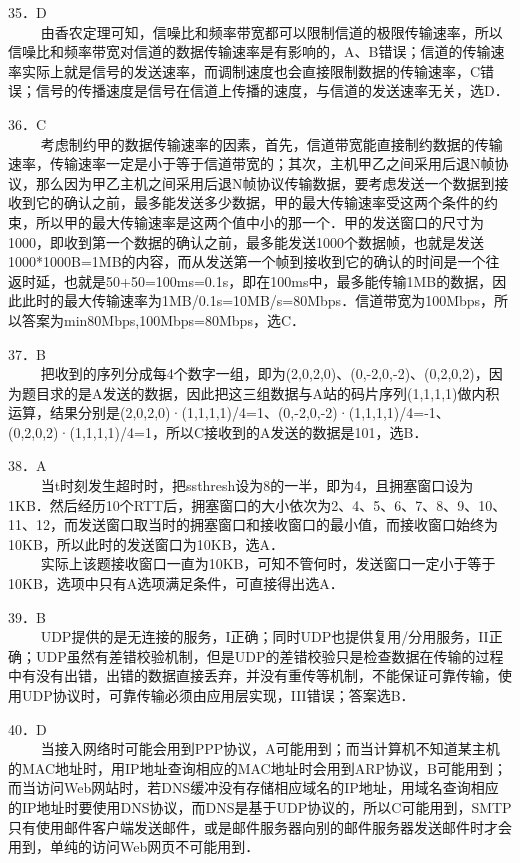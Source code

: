 35．D \\
$\qquad$ 由香农定理可知，信噪比和频率带宽都可以限制信道的极限传输速率，所以信噪比和频率带宽对信道的数据传输速率是有影响的，A、B错误；信道的传输速率实际上就是信号的发送速率，而调制速度也会直接限制数据的传输速率，C错误；信号的传播速度是信号在信道上传播的速度，与信道的发送速率无关，选D．

36．C \\
$\qquad$ 考虑制约甲的数据传输速率的因素，首先，信道带宽能直接制约数据的传输速率，传输速率一定是小于等于信道带宽的；其次，主机甲乙之间采用后退N帧协议，那么因为甲乙主机之间采用后退N帧协议传输数据，要考虑发送一个数据到接收到它的确认之前，最多能发送多少数据，甲的最大传输速率受这两个条件的约束，所以甲的最大传输速率是这两个值中小的那一个．甲的发送窗口的尺寸为1000，即收到第一个数据的确认之前，最多能发送1000个数据帧，也就是发送1000*1000B=1MB的内容，而从发送第一个帧到接收到它的确认的时间是一个往返时延，也就是50+50=100ms=0.1s，即在100ms中，最多能传输1MB的数据，因此此时的最大传输速率为1MB/0.1s=10MB/s=80Mbps．信道带宽为100Mbps，所以答案为min{80Mbps,100Mbps}=80Mbps，选C．

37．B \\
$\qquad$ 把收到的序列分成每4个数字一组，即为(2,0,2,0)、(0,-2,0,-2)、(0,2,0,2)，因为题目求的是A发送的数据，因此把这三组数据与A站的码片序列(1,1,1,1)做内积运算，结果分别是(2,0,2,0)·(1,1,1,1)/4=1、(0,-2,0,-2)·(1,1,1,1)/4=-1、(0,2,0,2)·(1,1,1,1)/4=1，所以C接收到的A发送的数据是101，选B．

38．A \\
$\qquad$ 当t时刻发生超时时，把ssthresh设为8的一半，即为4，且拥塞窗口设为1KB．然后经历10个RTT后，拥塞窗口的大小依次为2、4、5、6、7、8、9、10、11、12，而发送窗口取当时的拥塞窗口和接收窗口的最小值，而接收窗口始终为10KB，所以此时的发送窗口为10KB，选A． \\
$\qquad$ 实际上该题接收窗口一直为10KB，可知不管何时，发送窗口一定小于等于10KB，选项中只有A选项满足条件，可直接得出选A．


39．B \\
$\qquad$ UDP提供的是无连接的服务，I正确；同时UDP也提供复用/分用服务，II正确；UDP虽然有差错校验机制，但是UDP的差错校验只是检查数据在传输的过程中有没有出错，出错的数据直接丢弃，并没有重传等机制，不能保证可靠传输，使用UDP协议时，可靠传输必须由应用层实现，III错误；答案选B．

40．D \\
$\qquad$ 当接入网络时可能会用到PPP协议，A可能用到；而当计算机不知道某主机的MAC地址时，用IP地址查询相应的MAC地址时会用到ARP协议，B可能用到；而当访问Web网站时，若DNS缓冲没有存储相应域名的IP地址，用域名查询相应的IP地址时要使用DNS协议，而DNS是基于UDP协议的，所以C可能用到，SMTP只有使用邮件客户端发送邮件，或是邮件服务器向别的邮件服务器发送邮件时才会用到，单纯的访问Web网页不可能用到．

